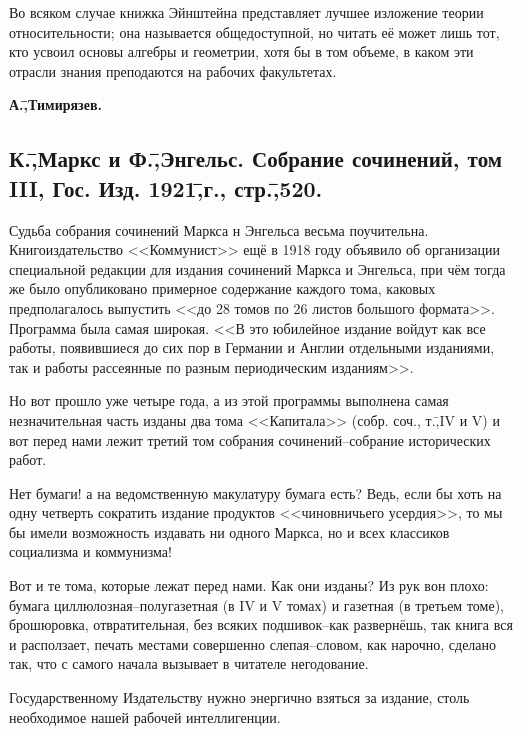 Во всяком случае книжка Эйнштейна представляет лучшее изложение теории относительности; она называется общедоступной, но читать её может лишь тот, кто усвоил основы алгебры и геометрии, хотя бы в том объеме, в каком эти отрасли знания преподаются на рабочих факультетах.

\begin{flushright}
 \textbf{А.\=,Тимирязев.}\hspace*{2em}
\end{flushright}

\subsection*{К.\=,Маркс и Ф.\=,Энгельс. Собрание сочинений, том III, Гос. Изд. 1921\=,г., стр.\=,520.}
\label{subsec:10.2}

Судьба собрания сочинений Маркса н Энгельса весьма поучительна. Книгоиздательство <<Коммунист>> ещё в 1918 году объявило об организации специальной редакции для издания сочинений Маркса и Энгельса, при чём тогда же было опубликовано примерное содержание каждого тома, каковых предполагалось выпустить <<до 28 томов по 26 листов большого формата>>. Программа была самая широкая. <<В это юбилейное издание войдут как все работы, появившиеся до сих пор в Германии и Англии отдельными изданиями, так и работы рассеянные по разным периодическим изданиям>>.

Но вот прошло уже четыре года, а из этой программы выполнена самая незначительная часть изданы два тома <<Капитала>> (собр. соч., т.\=,IV и V) и вот перед нами лежит третий том собрания сочинений\---собрание исторических работ.

Нет бумаги! а на ведомственную макулатуру бумага есть? Ведь, если бы хоть на одну четверть сократить издание продуктов <<чиновничьего усердия>>, то мы бы имели возможность издавать ни одного Маркса, но и всех классиков социализма и коммунизма!

Вот и те тома, которые лежат перед нами. Как они изданы? Из рук вон плохо: бумага циллюлозная\---полугазетная (в IV и V томах) и газетная (в третьем томе), брошюровка, отвратительная, без всяких подшивок\---как развернёшь, так книга вся и расползает, печать местами совершенно слепая\---словом, как нарочно, сделано так, что с самого начала вызывает в читателе негодование.

Государственному Издательству нужно энергично взяться за издание, столь необходимое нашей рабочей интеллигенции.

